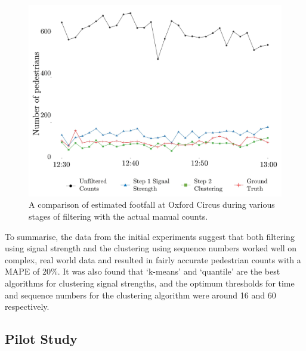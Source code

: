 \begin{figure}
  \includegraphics[trim={3 3 3 3},clip]{images/processing-oxst-results.jpg}
  \caption{A comparison of estimated footfall at Oxford Circus during various stages of filtering with the actual manual counts.}
  \label{figure:processing:oxst:results}
\end{figure}

To summarise, the data from the initial experiments suggest that both filtering using signal strength and the clustering using sequence numbers worked well on complex, real world data and resulted in fairly accurate pedestrian counts with a MAPE of 20\%.
It was also found that ‘k-means’ and ‘quantile’ are the best algorithms for clustering signal strengths, and the optimum thresholds for time and sequence numbers for the clustering algorithm were around 16 and 60 respectively.

\subsection{Pilot Study}

